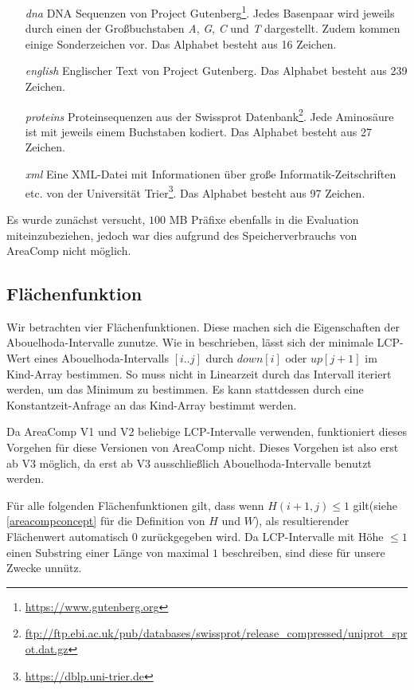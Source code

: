 \begin{itemize}[leftmargin=2cm]
    \item[\emph{dna}] DNA Sequenzen von Project Gutenberg\footnote{\label{footnotegutenberg}\url{https://www.gutenberg.org}}. Jedes Basenpaar wird jeweils durch einen der Großbuchstaben \emph{A}, \emph{G}, \emph{C} und \emph{T} dargestellt. Zudem kommen einige Sonderzeichen vor. Das Alphabet besteht aus 16 Zeichen.
    \item[\emph{english}] Englischer Text von Project Gutenberg. Das Alphabet besteht aus 239 Zeichen.
    \item[\emph{proteins}] Proteinsequenzen aus der Swissprot Datenbank\footnote{\url{ftp://ftp.ebi.ac.uk/pub/databases/swissprot/release_compressed/uniprot_sprot.dat.gz}}. Jede Aminosäure ist mit jeweils einem Buchstaben kodiert. Das Alphabet besteht aus 27 Zeichen.
    \item[\emph{xml}] Eine XML-Datei mit Informationen über große Informatik-Zeitschriften etc. von der Universität Trier\footnote{\url{https://dblp.uni-trier.de}}. Das Alphabet besteht aus 97 Zeichen.
\end{itemize}

Es wurde zunächst versucht, $100$ MB Präfixe ebenfalls in die Evaluation miteinzubeziehen, jedoch war dies aufgrund des Speicherverbrauchs von AreaComp nicht möglich.  

\subsection{Flächenfunktion}

Wir betrachten vier Flächenfunktionen. Diese machen sich die Eigenschaften der \\
Abouelhoda-Intervalle zunutze. 
Wie in \cite{abouelhoda_optimal_2002} beschrieben, lässt sich der minimale LCP-Wert eines Abouelhoda-Intervalls $[i..j]$ durch $down[i]$ oder $up[j+1]$ im Kind-Array bestimmen. 
So muss nicht in Linearzeit durch das Intervall iteriert werden, um das Minimum zu bestimmen. Es kann stattdessen durch eine Konstantzeit-Anfrage an das Kind-Array bestimmt werden. 

Da AreaComp V1 und V2 beliebige LCP-Intervalle verwenden, funktioniert dieses Vorgehen für diese Versionen von AreaComp nicht. Dieses Vorgehen ist also erst ab V3 möglich, da erst ab V3 ausschließlich Abouelhoda-Intervalle benutzt werden.

Für alle folgenden Flächenfunktionen gilt, dass wenn $H(i+1, j) \leq 1$ gilt(siehe \autoref{areacompconcept} für die Definition von $H$ und $W$), als resultierender Flächenwert automatisch $0$ zurückgegeben wird. Da LCP-Intervalle mit Höhe $\leq 1$ einen Substring einer Länge von maximal $1$ beschreiben, sind diese für unsere Zwecke unnütz.  

